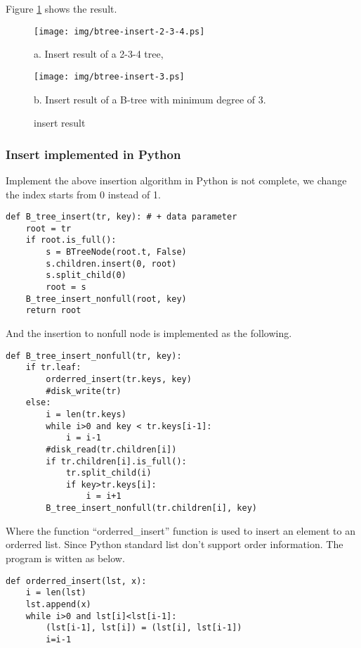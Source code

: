 \documentclass{article}
\begin{document}
Figure \ref{fig:btree-insert} shows the result.

\begin{figure}[htbp]
  \begin{center}
    \texttt{[image: img/btree-insert-2-3-4.ps]}

    a. Insert result of a 2-3-4 tree,

    \texttt{[image: img/btree-insert-3.ps]}

    b. Insert result of a B-tree with minimum degree of 3. 
    \caption{insert result} \label{fig:btree-insert}
  \end{center}
\end{figure}

\subsubsection*{Insert implemented in Python}
Implement the above insertion algorithm in Python is not complete, we change
the index starts from 0 instead of 1.

\lstset{language=Python}
\begin{lstlisting}
def B_tree_insert(tr, key): # + data parameter
    root = tr
    if root.is_full():
        s = BTreeNode(root.t, False)
        s.children.insert(0, root)
        s.split_child(0)
        root = s
    B_tree_insert_nonfull(root, key)
    return root
\end{lstlisting}

And the insertion to nonfull node is implemented as the following.

\begin{lstlisting}
def B_tree_insert_nonfull(tr, key):
    if tr.leaf:
        orderred_insert(tr.keys, key)
        #disk_write(tr)
    else:
        i = len(tr.keys)
        while i>0 and key < tr.keys[i-1]:
            i = i-1
        #disk_read(tr.children[i])
        if tr.children[i].is_full():
            tr.split_child(i)
            if key>tr.keys[i]:
                i = i+1
        B_tree_insert_nonfull(tr.children[i], key)
\end{lstlisting}

Where the function ``orderred\_insert'' function is used to insert an element
to an orderred list. Since Python standard list don't support order information.
The program is witten as below.

\begin{lstlisting}
def orderred_insert(lst, x):
    i = len(lst)
    lst.append(x)
    while i>0 and lst[i]<lst[i-1]:
        (lst[i-1], lst[i]) = (lst[i], lst[i-1])
        i=i-1
\end{lstlisting}
\end{document}
